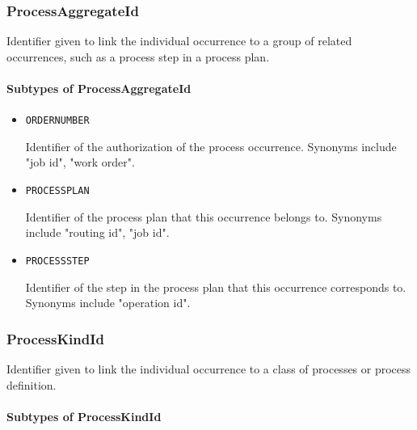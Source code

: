 \subsubsection{ProcessAggregateId}
\label{sec:ProcessAggregateId}



Identifier given to link the individual occurrence to a group of related occurrences, such as a process step in a process plan.


\paragraph{Subtypes of ProcessAggregateId}\mbox{}
\label{sec:Subtypes of ProcessAggregateId}

\begin{itemize}

\item \texttt{ORDER\textunderscore NUMBER}


Identifier of the authorization of the process occurrence. Synonyms include "job id", "work order".

\item \texttt{PROCESS\textunderscore PLAN}


Identifier of the process plan that this occurrence belongs to. Synonyms include "routing id", "job id".


\item \texttt{PROCESS\textunderscore STEP}


Identifier of the step in the process plan that this occurrence corresponds to. Synonyms include "operation id".


\end{itemize}






\subsubsection{ProcessKindId}
\label{sec:ProcessKindId}



Identifier given to link the individual occurrence to a class of processes or process definition.



\paragraph{Subtypes of ProcessKindId}\mbox{}
\label{sec:Subtypes of ProcessKindId}

